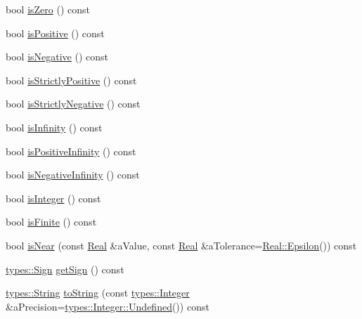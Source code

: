 \begin{DoxyCompactItemize}
bool \hyperlink{classostk_1_1core_1_1types_1_1_real_a75ad86e2311f12e604dcbdf07b2bc3ee}{is\+Zero} () const
\item 
bool \hyperlink{classostk_1_1core_1_1types_1_1_real_a43d9babd027a76ebe9017b3373f6cbee}{is\+Positive} () const
\item 
bool \hyperlink{classostk_1_1core_1_1types_1_1_real_a882d62f50a25e3e189419e93e58a5098}{is\+Negative} () const
\item 
bool \hyperlink{classostk_1_1core_1_1types_1_1_real_a823b512803ac5ce911a4f03f6a50fc32}{is\+Strictly\+Positive} () const
\item 
bool \hyperlink{classostk_1_1core_1_1types_1_1_real_aad3c1e798e1c7c19b06b8687c0f865b2}{is\+Strictly\+Negative} () const
\item 
bool \hyperlink{classostk_1_1core_1_1types_1_1_real_a9c5de2adb5ee58d89f1a09111386a11c}{is\+Infinity} () const
\item 
bool \hyperlink{classostk_1_1core_1_1types_1_1_real_a2484913d053b214e8c23eb063d8ac4e9}{is\+Positive\+Infinity} () const
\item 
bool \hyperlink{classostk_1_1core_1_1types_1_1_real_a406cbeee3c8379d151533efb479b2be9}{is\+Negative\+Infinity} () const
\item 
bool \hyperlink{classostk_1_1core_1_1types_1_1_real_ae2d39e5629e641c2303cdd603aa078f5}{is\+Integer} () const
\item 
bool \hyperlink{classostk_1_1core_1_1types_1_1_real_a33f8f5d0e9fae9acc7b3e94c4becbf32}{is\+Finite} () const
\item 
bool \hyperlink{classostk_1_1core_1_1types_1_1_real_a1f516b7b30733dcda1a7af90571dca22}{is\+Near} (const \hyperlink{classostk_1_1core_1_1types_1_1_real}{Real} \&a\+Value, const \hyperlink{classostk_1_1core_1_1types_1_1_real}{Real} \&a\+Tolerance=\hyperlink{classostk_1_1core_1_1types_1_1_real_a90fb5e0984bc7b71a4e4a5651c1933c2}{Real\+::\+Epsilon}()) const
\item 
\hyperlink{namespaceostk_1_1core_1_1types_ae10e15cf66b50aaec17f4f78c984d7bf}{types\+::\+Sign} \hyperlink{classostk_1_1core_1_1types_1_1_real_aea83e66cadd72387ec68ed189ae8a474}{get\+Sign} () const
\item 
\hyperlink{classostk_1_1core_1_1types_1_1_string}{types\+::\+String} \hyperlink{classostk_1_1core_1_1types_1_1_real_ae138041e5d596e63f216452686eeb34c}{to\+String} (const \hyperlink{classostk_1_1core_1_1types_1_1_integer}{types\+::\+Integer} \&a\+Precision=\hyperlink{classostk_1_1core_1_1types_1_1_integer_a389855c42819131d631ce512f0fc6947}{types\+::\+Integer\+::\+Undefined}()) const

\end{DoxyCompactItemize}
